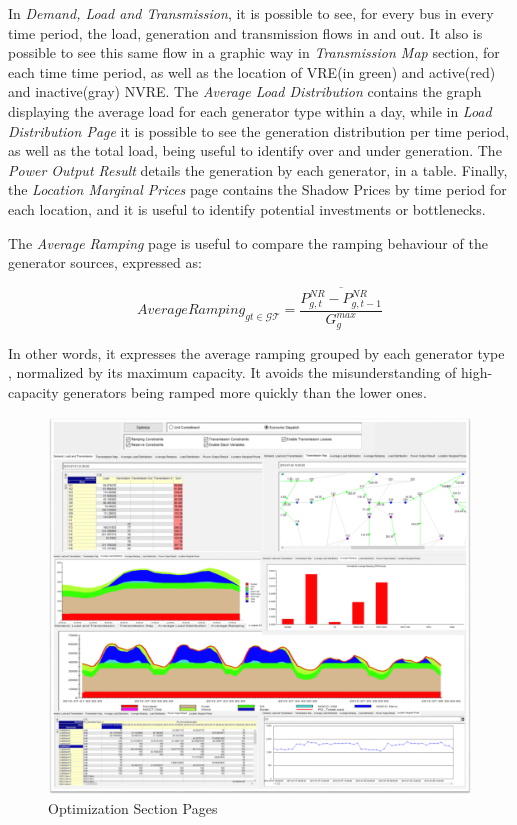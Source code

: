 \documentclass[12pt,LUDisStyle,twosided]{book}
\newcommand{\mc}{\mathcal}
\begin{document}
In \textit{Demand, Load and Transmission}, it is possible to see, for every bus in every time period, the load, generation and transmission flows in and out. It also is possible to see this same flow in a graphic way in \textit{Transmission Map} section, for each time time period, as well as the location of VRE(in green) and active(red) and inactive(gray) NVRE. The \textit{Average Load Distribution} contains the graph displaying the average load for each generator type within a day, while in \textit{Load Distribution Page} it is possible to see the generation distribution per time period, as well as the total load, being useful to identify over and under generation. The \textit{Power Output Result} details the generation by each generator, in a table. Finally, the \textit{Location Marginal Prices} page contains the Shadow Prices by time period for each location, and it is useful to identify potential investments or bottlenecks.

The \textit{Average Ramping} page is useful to compare the ramping behaviour of the generator sources, expressed as:

\begin{equation}
    AverageRamping_{gt \in \mc{GT}} = \overline{\dfrac{P^{NR}_{g,t} - P^{NR}_{g,t-1}}{G^{max}_{g}}}
\end{equation}

In other words, it expresses the average ramping grouped by each generator type , normalized by its maximum capacity. It avoids the misunderstanding of high-capacity generators being ramped more quickly than the lower ones.

\begin{figure}[H] 
	\begin{center}
		\includegraphics[width=\textwidth,height=\textheight,keepaspectratio]{aimmsOptimizationSectionPages.png}
	  	\caption{Optimization Section Pages}
     	\label{fig:optimizationSectionPages}
	\end{center}
\end{figure}
\end{document}
